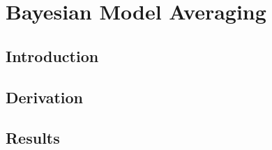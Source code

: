 
\chapter{Bayesian Model Averaging}
\label{cha:bma}

\section{Introduction}
\label{sec:into}

\section{Derivation}
\label{sec:notation}

\section{Results}
\label{sec:results}

